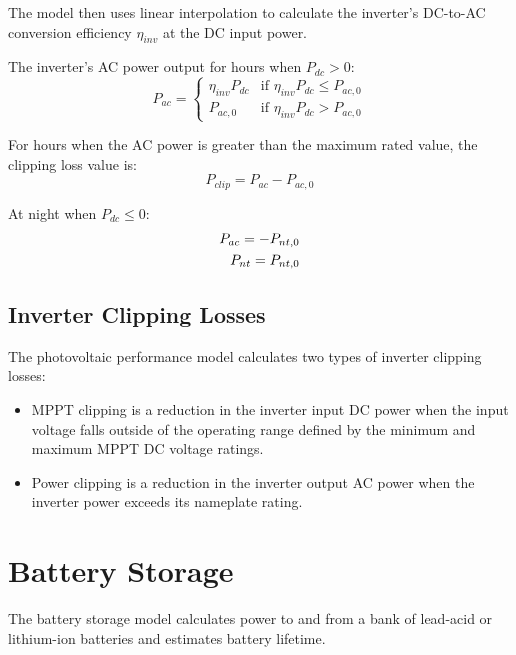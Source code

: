\documentclass[12pt,letterpaper]{article}
\begin{document}
The model then uses linear interpolation to calculate the inverter's DC-to-AC conversion efficiency $\eta_{inv}$ at the DC input power.

The inverter's AC power output for hours when $P_{dc}>0$:
\begin{equation}
P_{ac} = \left\{
\begin{array}{ll}
\eta_{inv} P_{dc} & \text{if $\eta_{inv} P_{dc} \leq P_{ac,0}$}\\
P_{ac,0} & \text{if $\eta_{inv} P_{dc} > P_{ac,0}$} 
\end{array}\right.
\end{equation}

For hours when the AC power is greater than the maximum rated value, the clipping loss value is:
\begin{equation}
P_{clip} = P_{ac} - P_{ac,0}
\end{equation}

At night when $P_{dc} \leq 0$:
\begin{align}
P_{ac} = -P_{nt,0} \notag\\
P_{nt} = P_{nt,0}
\end{align}

\section{Inverter Clipping Losses}\label{sec-invclip}

The photovoltaic performance model calculates two types of inverter clipping losses:

\begin{itemize}
\item MPPT clipping is a reduction in the inverter input DC power when the input voltage falls outside of the operating range defined by the minimum and maximum MPPT DC voltage ratings.
\item Power clipping is a reduction in the inverter output AC power when the inverter power exceeds its nameplate rating.
\end{itemize}



\chapter{Battery Storage}\label{battery}

The battery storage model calculates power to and from a bank of lead-acid or lithium-ion batteries and estimates battery lifetime.
\end{document}
